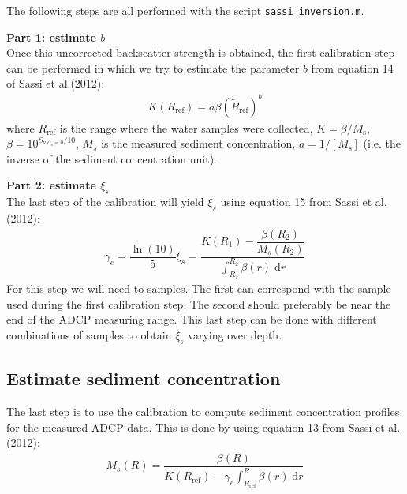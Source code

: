 \documentclass[]{artikel3}
\begin{document}
The following steps are all performed with the script \texttt{sassi\_inversion.m}.

\textbf{Part 1: estimate $b$}\\
Once this uncorrected backscatter strength is obtained, the first calibration step can be performed in which we try to estimate the parameter $b$ from equation 14 of Sassi et al.(2012):
\begin{align}
  K(R_\text{ref})=a\beta(\tilde{R}_\text{ref})^b
\end{align}
where $R_\text{ref}$ is the range where the water samples were collected, $K=\beta/M_\text{s}$, $\beta=10^{S_{\text{v,}\alpha_\text{s}=0}/10}$, $M_s$ is the measured sediment concentration, $a=1/[M_\text{s}]$ (i.e. the inverse of the sediment concentration unit). 

\textbf{Part 2: estimate $\xi_s$}\\
The last step of the calibration will yield $\xi_s$ using equation 15 from Sassi et al. (2012):
\begin{align}
  \gamma_e=\dfrac{\ln(10)}{5}\xi_s=\dfrac{K(R_1)-\dfrac{\beta(R_2)}{M_s(R_2)}}{\int_{R_1}^{R_2}\beta(r)\;\text{d}r}
\end{align}
For this step we will need to samples. The first can correspond with the sample used during the first calibration step, The second should preferably be near the end of the ADCP measuring range. This last step can be done with different combinations of samples to obtain $\xi_s$ varying over depth.


\subsection{Estimate sediment concentration}
The last step is to use the calibration to compute sediment concentration profiles for the measured ADCP data.
This is done by using equation 13 from Sassi et al. (2012):
\begin{align}
  M_s(R)=\dfrac{\beta(R)}{K(R_\text{ref})-\gamma_e\int_{R_\text{ref}}^R\beta(r)\;\text{d}r}
\end{align}
\end{document}
